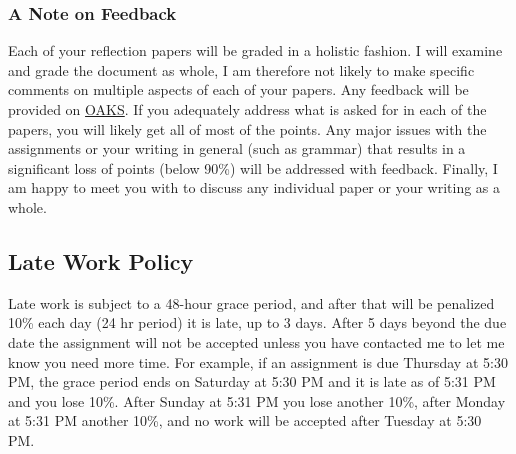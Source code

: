 \hypertarget{a-note-on-feedback}{%
\subsubsection{A Note on Feedback}\label{a-note-on-feedback}}

Each of your reflection papers will be graded in a holistic fashion. I
will examine and grade the document as whole, I am therefore not likely
to make specific comments on multiple aspects of each of your papers.
Any feedback will be provided on \href{https://lms.cofc.edu}{OAKS}. If
you adequately address what is asked for in each of the papers, you will
likely get all of most of the points. Any major issues with the
assignments or your writing in general (such as grammar) that results in
a significant loss of points (below 90\%) will be addressed with
feedback. Finally, I am happy to meet you with to discuss any individual
paper or your writing as a whole.

\hypertarget{late-work-policy}{%
\subsection{Late Work Policy}\label{late-work-policy}}

Late work is subject to a 48-hour grace period, and after that will be
penalized 10\% each day (24 hr period) it is late, up to 3 days. After 5
days beyond the due date the assignment will not be accepted unless you
have contacted me to let me know you need more time. For example, if an
assignment is due Thursday at 5:30 PM, the grace period ends on Saturday
at 5:30 PM and it is late as of 5:31 PM and you lose 10\%. After Sunday
at 5:31 PM you lose another 10\%, after Monday at 5:31 PM another 10\%,
and no work will be accepted after Tuesday at 5:30 PM.
